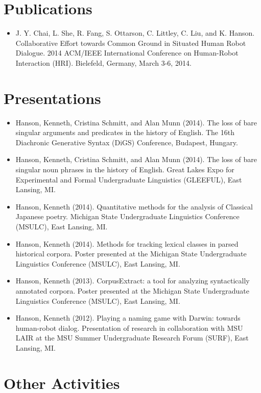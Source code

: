 \documentclass[10pt,oneside]{article}
\newcommand{\ressection}[1]{
	\vspace{-12pt}
	\section*{#1}
}
\begin{document}
\ressection{Publications}

\begin{itemize}
	\item{J. Y. Chai, L. She, R. Fang, S. Ottarson, C. Littley, C. Liu, and K. Hanson. Collaborative Effort towards Common Ground in Situated Human Robot Dialogue. 2014 ACM/IEEE International Conference on Human-Robot Interaction (HRI). Bielefeld, Germany, March 3-6, 2014.}
\end{itemize}



\ressection{Presentations}

\begin{itemize}
	\item{Hanson, Kenneth, Cristina Schmitt, and Alan Munn (2014). The loss of bare singular arguments and predicates in the history of English. The 16th Diachronic Generative Syntax (DiGS) Conference, Budapest, Hungary.}
	
	\item{Hanson, Kenneth, Cristina Schmitt, and Alan Munn (2014). The loss of bare singular noun phrases in the history of English. Great Lakes Expo for Experimental and Formal Undergraduate Linguistics (GLEEFUL), East Lansing, MI.}
	
	\item{Hanson, Kenneth (2014). Quantitative methods for the analysis of Classical Japanese poetry. Michigan State Undergraduate Linguistics Conference (MSULC), East Lansing, MI.}
	
	\item{Hanson, Kenneth (2014). Methods for tracking lexical classes in parsed historical corpora. Poster presented at the Michigan State Undergraduate Linguistics Conference (MSULC), East Lansing, MI.}
	
	\item{Hanson, Kenneth (2013). CorpusExtract: a tool for analyzing syntactically annotated corpora. Poster presented at the Michigan State Undergraduate Linguistics Conference (MSULC), East Lansing, MI.}
	
	\item{Hanson, Kenneth (2012). Playing a naming game with Darwin: towards human-robot dialog. Presentation of research in collaboration with MSU LAIR at the MSU Summer Undergraduate Research Forum (SURF), East Lansing, MI.}
\end{itemize}



\ressection{Other Activities}
\end{document}

